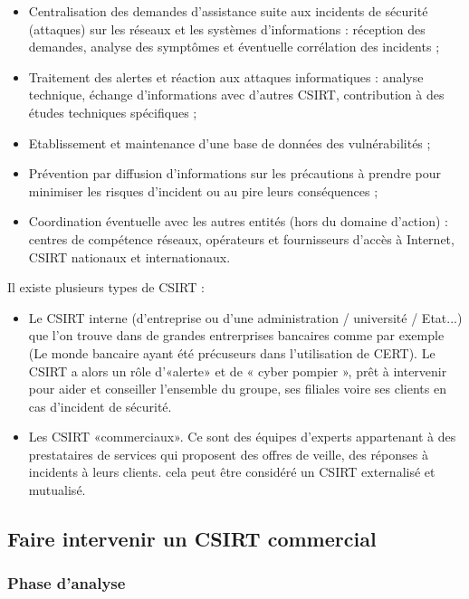 \begin{itemize}
  \item Centralisation des demandes d’assistance suite aux incidents de sécurité (attaques) sur les réseaux et les systèmes d’informations : réception des demandes, analyse des symptômes et éventuelle corrélation des incidents ;
  \item Traitement des alertes et réaction aux attaques informatiques : analyse technique, échange d’informations avec d’autres CSIRT, contribution à des études techniques spécifiques ;
  \item Etablissement et maintenance d’une base de données des vulnérabilités ;
  \item Prévention par diffusion d’informations sur les précautions à prendre pour minimiser les risques d’incident ou au pire leurs conséquences ;
  \item Coordination éventuelle avec les autres entités (hors du domaine d’action) : centres de compétence réseaux, opérateurs et fournisseurs d’accès à Internet, CSIRT nationaux et internationaux.
\end{itemize}

Il existe plusieurs types de CSIRT :

\begin{itemize}
  \item  Le CSIRT interne (d’entreprise ou d’une administration / université / Etat...) que l'on trouve dans de grandes entrerprises bancaires comme par exemple (Le monde bancaire ayant été précuseurs dans l'utilisation de CERT). Le CSIRT a alors un rôle d’«alerte» et de « cyber pompier », prêt à intervenir pour aider et conseiller l’ensemble du groupe, ses filiales voire ses clients en cas d’incident de sécurité.
  \item  Les CSIRT «commerciaux». Ce sont des équipes d’experts appartenant à des prestataires de services qui  proposent des offres de veille, des réponses à incidents à leurs clients. cela peut être  considéré  un CSIRT externalisé et mutualisé.
\end{itemize}
 
 
  \subsection{Faire intervenir un CSIRT commercial}
 \subsubsection{Phase d'analyse}

